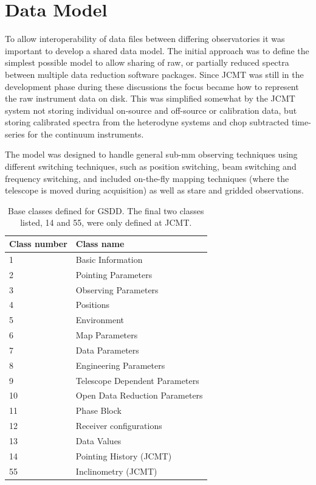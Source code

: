 \documentclass[final,authoryear,5p,times,twocolumn]{elsarticle}
\begin{document}
\section{Data Model}

To allow interoperability of data files between differing
observatories it was important to develop a shared data model. The
initial approach was to define the simplest possible model to allow
sharing of
raw, or partially reduced spectra between multiple data reduction software
packages. Since JCMT was still in the development phase during these
discussions the focus became how to represent the raw instrument data
on disk. This was simplified somewhat by the JCMT system not storing
individual on-source and off-source or calibration data, but storing
calibrated spectra from the heterodyne systems and chop subtracted
time-series for the continuum instruments.

The model was designed to handle general sub-mm observing techniques
using different switching techniques, such as position switching, beam
switching and frequency switching, and included on-the-fly mapping
techniques (where the telescope is moved during acquisition) as well
as stare and gridded observations.

\begin{table}
\caption{Base classes defined for GSDD. The final two classes listed,
  14 and 55, were only defined at JCMT.}
\label{tab:classes}
\begin{center}
\begin{tabular}{ll}
\hline
Class number &Class name \\ \hline
1         & Basic Information \\
2         & Pointing Parameters  \\
3         & Observing Parameters \\
4         & Positions \\
5         & Environment \\
6         & Map Parameters \\
7         & Data Parameters \\
8         & Engineering Parameters \\
9         & Telescope Dependent Parameters \\
10        & Open Data Reduction Parameters \\
11        & Phase Block \\
12        & Receiver configurations\\
13        & Data Values \\
14        & Pointing History (JCMT) \\
55        & Inclinometry (JCMT)\\
\hline
\end{tabular}
\end{center}
\end{table}
\end{document}
